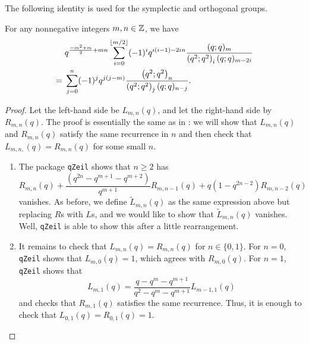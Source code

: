 The following identity is used for the symplectic and orthogonal groups.
\begin{prop} \label{prop:sp-q-identity}
    For any nonnegative integers $m,n\in\mathbb Z$, we have
    \begin{align*}
        & q^{\frac{-m^2+m}2+mn}\sum_{i=0}^{\left\lfloor{m/2}\right\rfloor}(-1)^iq^{i(i-1)-2in}\frac{(q;q)_m}{\left(q^2;q^2\right)_i(q;q)_{m-2i}} \\
        ={}& \sum_{j=0}^n(-1)^jq^{j(j-m)}\frac{\left(q^2;q^2\right)_{n}}{\left(q^2;q^2\right)_j(q;q)_{n-j}}.
    \end{align*}
\end{prop}
\begin{proof}
    Let the left-hand side be $L_{m,n}(q)$, and let the right-hand side by $R_{m,n}(q)$. The proof is essentially the same as in : we will show that $L_{m,n}(q)$ and $R_{m,n}(q)$ satisfy the same recurrence in $n$ and then check that $L_{m,n,}(q)=R_{m,n}(q)$ for some small $n$.
    \begin{enumerate}
        \item The package \texttt{qZeil} shows that $n\ge2$ has
        \[R_{m,n}\left(q\right)+\frac{\left(q^{2n}-q^{m+1}-q^{m+2}\right)}{q^{m+1}}R_{m,n-1}\left(q\right)+q\left(1-q^{2n-2}\right)R_{m,n-2}\left(q\right)\]
        vanishes. As before, we define $\widetilde L_{m,n}(q)$ as the same expression above but replacing $R$s with $L$s, and we would like to show that $\widetilde L_{m,n}(q)$ vanishes. Well, \texttt{qZeil} is able to show this after a little rearrangement.
        \item It remains to check that $L_{m,n}(q)=R_{m,n}(q)$ for $n\in\{0,1\}$. For $n=0$, \texttt{qZeil} shows that $L_{m,0}(q)=1$, which agrees with $R_{m,0}(q)$. For $n=1$, \texttt{qZeil} shows that
        \[L_{m,1}(q)=\frac{q-q^m-q^{m+1}}{q^2-q^m-q^{m+1}}L_{m-1,1}(q)\]
        and checks that $R_{m,1}(q)$ satisfies the same recurrence. Thus, it is enough to check that $L_{0,1}(q)=R_{0,1}(q)=1$.
        \qedhere
    \end{enumerate}
\end{proof}

